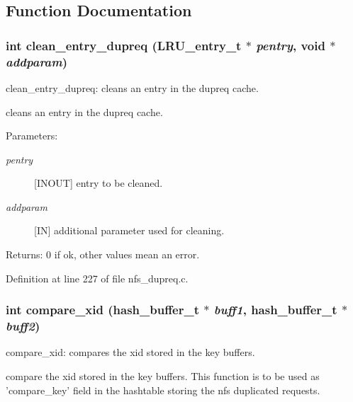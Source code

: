 \subsection{Function Documentation}
\subsubsection[{clean\_\-entry\_\-dupreq}]{\setlength{\rightskip}{0pt plus 5cm}int clean\_\-entry\_\-dupreq (LRU\_\-entry\_\-t $\ast$ {\em pentry}, \/  void $\ast$ {\em addparam})}\label{nfs__dupreq_8c_0dd9a264f91e9823e807b34e6994f777}


clean\_\-entry\_\-dupreq: cleans an entry in the dupreq cache.

cleans an entry in the dupreq cache.

\begin{Desc}
\item[Parameters:]
\begin{description}
\item[{\em pentry}][INOUT] entry to be cleaned. \item[{\em addparam}][IN] additional parameter used for cleaning.\end{description}
\end{Desc}
\begin{Desc}
\item[Returns:]0 if ok, other values mean an error. \end{Desc}


Definition at line 227 of file nfs\_\-dupreq.c.
\subsubsection[{compare\_\-xid}]{\setlength{\rightskip}{0pt plus 5cm}int compare\_\-xid (hash\_\-buffer\_\-t $\ast$ {\em buff1}, \/  hash\_\-buffer\_\-t $\ast$ {\em buff2})}\label{nfs__dupreq_8c_1754ccd21821c745e816f32a7a459e24}


compare\_\-xid: compares the xid stored in the key buffers.

compare the xid stored in the key buffers. This function is to be used as 'compare\_\-key' field in the hashtable storing the nfs duplicated requests.

